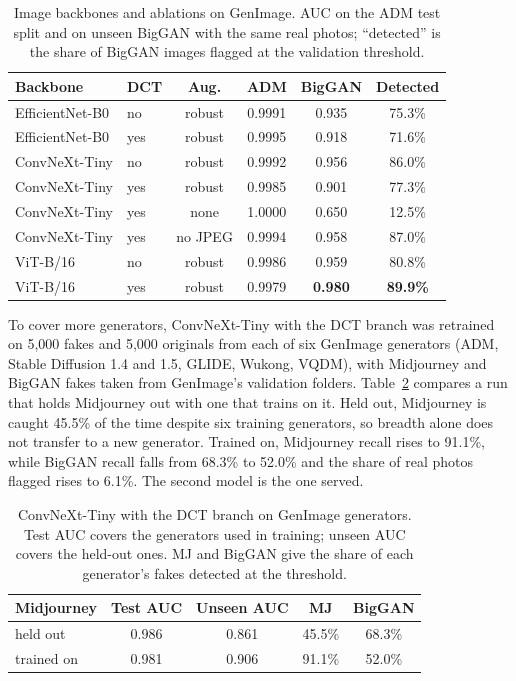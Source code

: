\documentclass[conference]{IEEEtran}
\begin{document}
\begin{table}[t]
\centering
\caption{Image backbones and ablations on GenImage. AUC on the ADM test split and on unseen BigGAN with the same real photos; ``detected'' is the share of BigGAN images flagged at the validation threshold.}
\label{tab:image-grid}
\footnotesize
\begin{tabular}{llcccc}
\toprule
\textbf{Backbone} & \textbf{DCT} & \textbf{Aug.} & \textbf{ADM} & \textbf{BigGAN} & \textbf{Detected} \\
\midrule
EfficientNet-B0 & no & robust & 0.9991 & 0.935 & 75.3\% \\
EfficientNet-B0 & yes & robust & 0.9995 & 0.918 & 71.6\% \\
ConvNeXt-Tiny & no & robust & 0.9992 & 0.956 & 86.0\% \\
ConvNeXt-Tiny & yes & robust & 0.9985 & 0.901 & 77.3\% \\
ConvNeXt-Tiny & yes & none & 1.0000 & 0.650 & 12.5\% \\
ConvNeXt-Tiny & yes & no JPEG & 0.9994 & 0.958 & 87.0\% \\
ViT-B/16 & no & robust & 0.9986 & 0.959 & 80.8\% \\
ViT-B/16 & yes & robust & 0.9979 & \textbf{0.980} & \textbf{89.9\%} \\
\bottomrule
\end{tabular}
\end{table}

To cover more generators, ConvNeXt-Tiny with the DCT branch was retrained on 5,000 fakes and 5,000 originals from each of six GenImage generators (ADM, Stable Diffusion 1.4 and 1.5, GLIDE, Wukong, VQDM), with Midjourney and BigGAN fakes taken from GenImage's validation folders. Table~\ref{tab:image-multigen} compares a run that holds Midjourney out with one that trains on it. Held out, Midjourney is caught 45.5\% of the time despite six training generators, so breadth alone does not transfer to a new generator. Trained on, Midjourney recall rises to 91.1\%, while BigGAN recall falls from 68.3\% to 52.0\% and the share of real photos flagged rises to 6.1\%. The second model is the one served.

\begin{table}[t]
\centering
\caption{ConvNeXt-Tiny with the DCT branch on GenImage generators. Test AUC covers the generators used in training; unseen AUC covers the held-out ones. MJ and BigGAN give the share of each generator's fakes detected at the threshold.}
\label{tab:image-multigen}
\begin{tabular}{lcccc}
\toprule
\textbf{Midjourney} & \textbf{Test AUC} & \textbf{Unseen AUC} & \textbf{MJ} & \textbf{BigGAN} \\
\midrule
held out & 0.986 & 0.861 & 45.5\% & 68.3\% \\
trained on & 0.981 & 0.906 & 91.1\% & 52.0\% \\
\bottomrule
\end{tabular}
\end{table}
\end{document}
